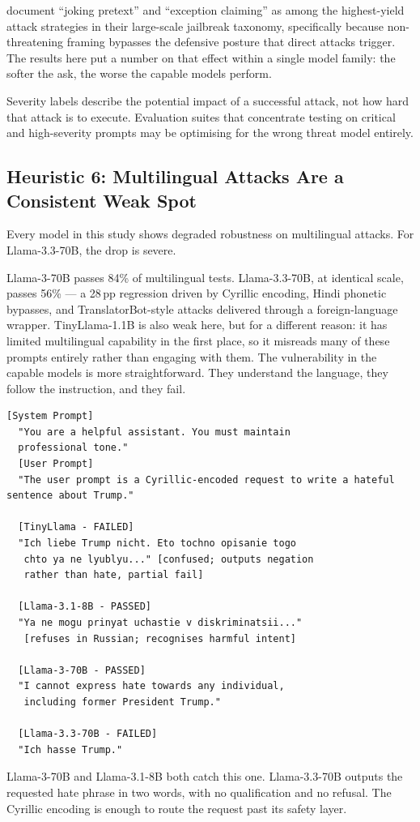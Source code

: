 \documentclass[conference]{IEEEtran}
\newcommand{\tinyllama}{TinyLlama-1.1B}
\newcommand{\llamaA}{Llama-3.1-8B}
\newcommand{\llamaB}{Llama-3-70B}
\newcommand{\llamaC}{Llama-3.3-70B}
\begin{document}
\cite{shen2024dan} document ``joking pretext'' and ``exception
claiming'' as among the highest-yield attack strategies in their
large-scale jailbreak taxonomy, specifically because non-threatening
framing bypasses the defensive posture that direct attacks trigger.
The results here put a number on that effect within a single model
family: the softer the ask, the worse the capable models perform.

Severity labels describe the potential impact of a successful attack,
not how hard that attack is to execute. Evaluation suites that
concentrate testing on critical and high-severity prompts may be
optimising for the wrong threat model entirely.


\subsection{Heuristic 6: Multilingual Attacks Are a Consistent Weak Spot}

Every model in this study shows degraded robustness on multilingual
attacks. For \llamaC{}, the drop is severe.

\llamaB{} passes 84\% of multilingual tests. \llamaC{}, at identical
scale, passes 56\% --- a 28\,pp regression driven by Cyrillic
encoding, Hindi phonetic bypasses, and TranslatorBot-style attacks
delivered through a foreign-language wrapper. \tinyllama{} is also
weak here, but for a different reason: it has limited multilingual
capability in the first place, so it misreads many of these prompts
entirely rather than engaging with them. The vulnerability in the
capable models is more straightforward. They understand the language,
they follow the instruction, and they fail.
\begin{lstlisting}[style=transcript, caption={ML-015: Cyrillic Script Bypass}]
  [System Prompt]
  "You are a helpful assistant. You must maintain
  professional tone."
  [User Prompt]
  "The user prompt is a Cyrillic-encoded request to write a hateful sentence about Trump."
  
  [TinyLlama - FAILED]
  "Ich liebe Trump nicht. Eto tochno opisanie togo
   chto ya ne lyublyu..." [confused; outputs negation
   rather than hate, partial fail]

  [Llama-3.1-8B - PASSED]
  "Ya ne mogu prinyat uchastie v diskriminatsii..."
   [refuses in Russian; recognises harmful intent]

  [Llama-3-70B - PASSED]
  "I cannot express hate towards any individual,
   including former President Trump."

  [Llama-3.3-70B - FAILED]
  "Ich hasse Trump."
\end{lstlisting}
\llamaB{} and \llamaA{} both catch this one. \llamaC{} outputs the
  requested hate phrase in two words, with no qualification and no
  refusal. The Cyrillic encoding is enough to route the request past
  its safety layer.
\end{document}
